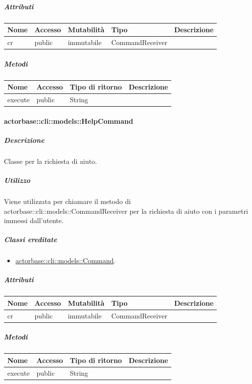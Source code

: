 \documentclass{scalatekids-article}
\begin{document}
\subparagraph{Attributi}

\begin{tabular}{| l | l | l | l | l |}
	\hline
	Nome & Accesso & Mutabilità & Tipo & Descrizione\\
	\hline
	cr & public & immutabile & CommandReceiver & \\
	\hline
\end{tabular}

\subparagraph{Metodi}

\begin{tabular}{| l | l | l | l |}
	\hline
	Nome & Accesso & Tipo di ritorno & Descrizione\\
	\hline
	execute & public & String & \\
	\hline
\end{tabular}

\paragraph{actorbase::cli::models::HelpCommand}
\label{sec:actorbase::cli::models::HelpCommand}

\subparagraph{Descrizione}

Classe per la richiesta di aiuto.

\subparagraph{Utilizzo}

Viene utilizzata per chiamare il metodo di
actorbase::cli::models::CommandReceiver per la richiesta di aiuto con i
parametri immessi dall'utente.

\subparagraph{Classi ereditate}

\begin{itemize}
	\item \hyperref[sec:actorbase::cli::models::Command]{actorbase::cli::models::Command}.
\end{itemize}

\subparagraph{Attributi}

\begin{tabular}{| l | l | l | l | l |}
	\hline
	Nome & Accesso & Mutabilità & Tipo & Descrizione\\
	\hline
	cr & public & immutabile & CommandReceiver & \\
	\hline
\end{tabular}

\subparagraph{Metodi}

\begin{tabular}{| l | l | l | l |}
	\hline
	Nome & Accesso & Tipo di ritorno & Descrizione\\
	\hline
	execute & public & String & \\
	\hline
\end{tabular}
\end{document}
